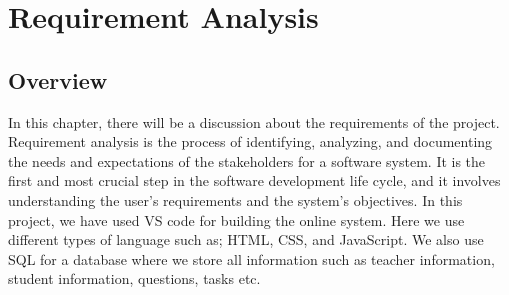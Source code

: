 \chapter{Requirement Analysis}

\section{Overview}
In this chapter, there will be a discussion about the requirements of the project. Requirement analysis is the process of identifying, analyzing, and documenting the needs and expectations of the stakeholders for a software system. It is the first and most crucial step in the software development life cycle, and it involves understanding the user’s requirements and the system’s objectives. In this project, we have used VS code for building the online system. Here we use different types of language such as; HTML, CSS, and JavaScript. We also use SQL for a database where we store all information such as teacher information, student information, questions, tasks etc.

